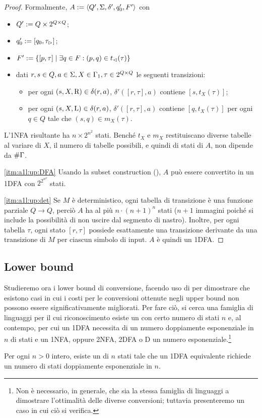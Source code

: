 \begin{proof}
	Formalmente, $A:=\langle Q',\Sigma,\delta',q_0',F' \rangle$ con
	\begin{itemize}
		\item $Q':=Q\times2^{Q\times Q}$;
		\item $q_0':=[q_0,\tau_\rhd]$;
		\item $F':=\left\{ [p,\tau]\mid \exists q\in F: (p,q)\in t_\lhd(\tau) \right\}$
		\item dati $r,s\in Q,a\in\Sigma,X\in\Gamma_1,\tau\in2^{Q\times Q}$ le seguenti transizioni:
		      \begin{itemize}
			      \item per ogni $(s,X,\mathrm R)\in\delta(r,a)$, $\delta'([r,\tau],a)$ contiene $[s,t_X(\tau)]$;
			      \item per ogni $(s,X,\mathrm L)\in\delta(r,a)$, $\delta'([r,\tau],a)$ contiene $[q,t_X(\tau)]$ per ogni $q\in Q$ tale che $(s,q)\in m_X(\tau)$.
		      \end{itemize}
	\end{itemize}
	L'1NFA risultante ha $n\times 2^{n^2}$ stati. Benché $t_X$ e $m_X$ restituiscano diverse tabelle al variare di $X$, il numero di tabelle possibili, e quindi di stati di $A$, non dipende da $\# \Gamma$.

	\ref{itm:a1l:up:DFA} Usando la subset construction (\cite{Rabin:59:NFA}), $A$ può essere convertito in un 1DFA con $2^{2^{n^2}}$ stati.

	\ref{itm:a1l:up:det} Se $M$ è deterministico, ogni tabella di transizione è una funzione parziale $Q\to Q$, perciò $A$ ha al più $n\cdot(n+1)^n$ stati ($n+1$ immagini poiché si include la possibilità di non uscire dal segmento di nastro). Inoltre, per ogni tabella $\tau$, ogni stato $[r,\tau]$ possiede esattamente una transizione derivante da una transizione di $M$ per ciascun simbolo di input. $A$ è quindi un 1DFA.
\end{proof}


\subsection{Lower bound}\label{subs:a1l:low}
Studieremo ora i lower bound di conversione, facendo uso di  per dimostrare che esistono casi in cui i costi per le conversioni ottenute negli upper bound non possono essere significativamente migliorati. Per fare ciò, si cerca una famiglia di linguaggi per il cui riconoscimento esiste un  con certo numero di stati $n$ e, al contempo, per cui un 1DFA necessita di un numero doppiamente esponenziale in $n$ di stati e un 1NFA, oppure 2NFA, 2DFA o D un numero esponenziale.\footnote{Non è necessario, in generale, che sia la stessa famiglia di linguaggi a dimostrare l'ottimalità delle diverse conversioni; tuttavia presenteremo un caso in cui ciò si verifica.}
\begin{theor}
	Per ogni $n>0$ intero, esiste un  di $n$ stati tale che un 1DFA equivalente richiede un numero di stati doppiamente esponenziale in $n$.
\end{theor}


